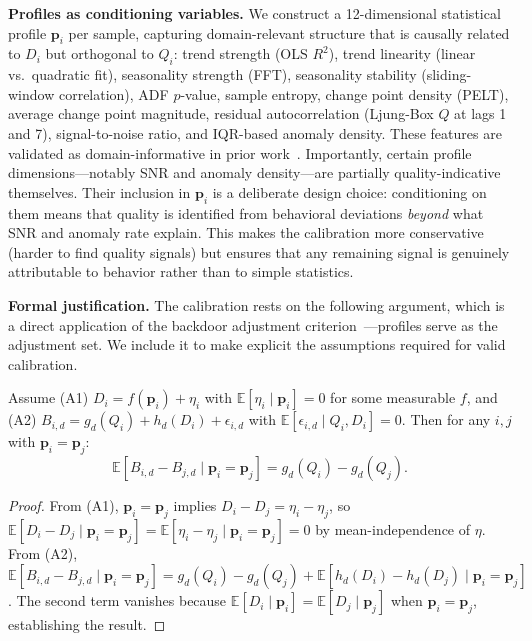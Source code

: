 \documentclass{article}
\begin{document}
\textbf{Profiles as conditioning variables.} We construct a 12-dimensional statistical profile $\mathbf{p}_i$ per sample, capturing domain-relevant structure that is causally related to $D_i$ but orthogonal to $Q_i$: trend strength (OLS $R^2$), trend linearity (linear vs.\ quadratic fit), seasonality strength (FFT), seasonality stability (sliding-window correlation), ADF $p$-value, sample entropy, change point density (PELT), average change point magnitude, residual autocorrelation (Ljung-Box $Q$ at lags 1 and 7), signal-to-noise ratio, and IQR-based anomaly density. These features are validated as domain-informative in prior work~\citep{forecastcore2026, wang2006characteristic}. Importantly, certain profile dimensions---notably SNR and anomaly density---are partially quality-indicative themselves. Their inclusion in $\mathbf{p}_i$ is a deliberate design choice: conditioning on them means that quality is identified from behavioral deviations \emph{beyond} what SNR and anomaly rate explain. This makes the calibration more conservative (harder to find quality signals) but ensures that any remaining signal is genuinely attributable to behavior rather than to simple statistics.

\textbf{Formal justification.} The calibration rests on the following argument, which is a direct application of the backdoor adjustment criterion~\citep{pearl2009causality}---profiles serve as the adjustment set. We include it to make explicit the assumptions required for valid calibration.

\begin{proposition}
\label{prop:identification}
Assume (A1) $D_i = f(\mathbf{p}_i) + \eta_i$ with $\mathbb{E}[\eta_i \mid \mathbf{p}_i] = 0$ for some measurable $f$, and (A2) $B_{i,d} = g_d(Q_i) + h_d(D_i) + \epsilon_{i,d}$ with $\mathbb{E}[\epsilon_{i,d} \mid Q_i, D_i] = 0$. Then for any $i, j$ with $\mathbf{p}_i = \mathbf{p}_j$:
\begin{equation}
    \mathbb{E}[B_{i,d} - B_{j,d} \mid \mathbf{p}_i = \mathbf{p}_j] = g_d(Q_i) - g_d(Q_j).
\end{equation}
\end{proposition}

\begin{proof}
From (A1), $\mathbf{p}_i = \mathbf{p}_j$ implies $D_i - D_j = \eta_i - \eta_j$, so $\mathbb{E}[D_i - D_j \mid \mathbf{p}_i = \mathbf{p}_j] = \mathbb{E}[\eta_i - \eta_j \mid \mathbf{p}_i = \mathbf{p}_j] = 0$ by mean-independence of $\eta$. From (A2), $\mathbb{E}[B_{i,d} - B_{j,d} \mid \mathbf{p}_i = \mathbf{p}_j] = g_d(Q_i) - g_d(Q_j) + \mathbb{E}[h_d(D_i) - h_d(D_j) \mid \mathbf{p}_i = \mathbf{p}_j]$. The second term vanishes because $\mathbb{E}[D_i \mid \mathbf{p}_i] = \mathbb{E}[D_j \mid \mathbf{p}_j]$ when $\mathbf{p}_i = \mathbf{p}_j$, establishing the result.
\end{proof}
\end{document}
